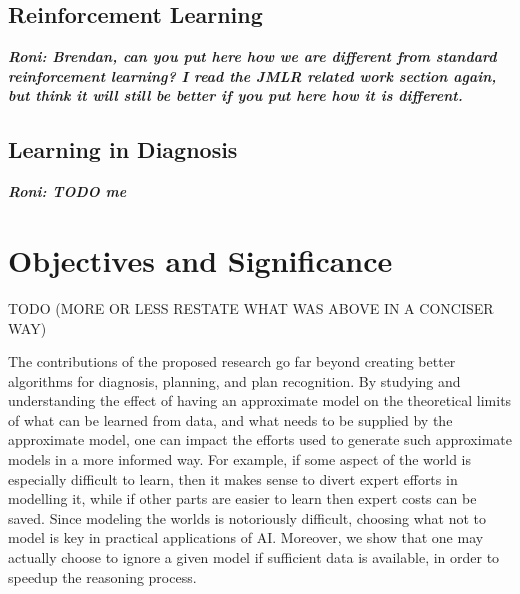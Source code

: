 \documentclass[12pt]{article}
\newcommand{\note}[1]{\textbf{\textit{#1}}}
\begin{document}
\subsection{Reinforcement Learning}
\note{Roni: Brendan, can you put here how we are different from standard reinforcement learning? 
I read the JMLR related work section again, but think it will still be better if you put here
how it is different.}


\subsection{Learning in Diagnosis}
\note{Roni: TODO me}

\section{Objectives and Significance}

TODO (MORE OR LESS RESTATE WHAT WAS ABOVE IN A CONCISER WAY)




The contributions of the proposed research go far beyond creating better algorithms for diagnosis, planning, and plan recognition.  By studying and understanding the effect of having an approximate model on the theoretical limits of what can be learned from data, 
and what needs to be supplied by the approximate model, one can impact the efforts used to generate such approximate models in a more informed way. For example, if some aspect of the world is especially difficult to learn, then it makes sense to divert expert efforts in modelling it, while if other parts are easier to learn then expert costs can be saved. Since modeling the worlds is notoriously difficult, choosing what not to model is key in practical applications of AI. 
Moreover, we show that one may actually choose to ignore a given model 
if sufficient data is available, in order to speedup the reasoning process. 



\end{document}
